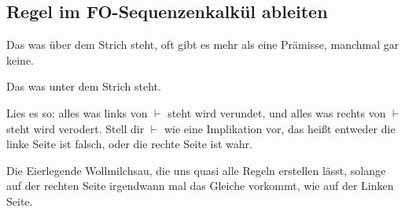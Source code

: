 \documentclass[
    ngerman,
    color=3b,
    summary,
    boxarc,
    main,
    fleqn,
    leqno,
]{rubos-tuda-template}
\begin{document}
    \subsection{Regel im FO-Sequenzenkalkül ableiten}
    \begin{definition}[Prämisse]
        Das was über dem Strich steht, oft gibt es mehr als eine Prämisse, manchmal gar keine.
    \end{definition}
    \begin{definition}[Konklusion]
        Das was unter dem Strich steht.
    \end{definition}
    \begin{definition}[$\vdash$]
        Lies es so: alles was links von $\vdash$ steht wird verundet, und alles was rechts von $\vdash$ steht wird verodert. Stell dir $\vdash$ wie eine Implikation vor, das heißt entweder die linke Seite ist falsch, oder die rechte Seite ist wahr.
    \end{definition}
    \begin{definition}[Regel (Ax)]
        Die Eierlegende Wollmilchsau, die uns quasi alle Regeln erstellen lässt, solange auf der rechten Seite irgendwann mal das Gleiche vorkommt, wie auf der Linken Seite.
    \end{definition}
\end{document}
